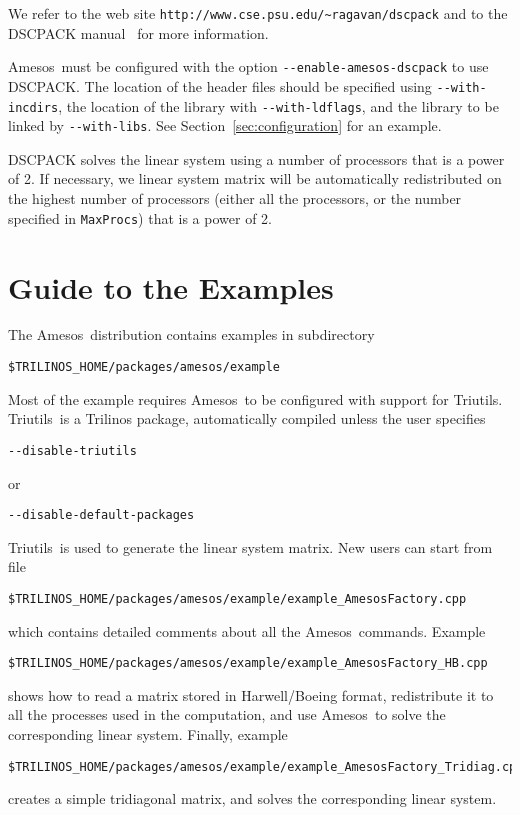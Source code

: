 \documentclass[11pt]{SANDreport}
\newcommand{\amesos}{{\sc Amesos}}
\newcommand{\triutils}{{\sc Triutils}}
\begin{document}
We refer to the web site
\verb!http://www.cse.psu.edu/~ragavan/dscpack!
and to the DSCPACK manual~\cite{dscpack-manual} for more
information.

\amesos\ must be configured with the option
\verb!--enable-amesos-dscpack! to use DSCPACK.
The location of the header files should be specified using \verb!--with-incdirs!,
the location of the library with \verb!--with-ldflags!, and the library
to be linked by \verb!--with-libs!. See Section~\ref{sec:configuration} for an
example.

DSCPACK solves the linear system using a number of processors that is a power
of 2. If necessary, we linear system matrix will be automatically
redistributed on the highest number of processors (either all the
processors, or the number specified in \verb!MaxProcs!) that is a power of 2.

\section{Guide to the Examples}
\label{sec:examples}

The \amesos\ distribution contains examples in subdirectory
\begin{verbatim}
$TRILINOS_HOME/packages/amesos/example
\end{verbatim}
Most of the example requires \amesos\ to be configured with support for
\triutils. \triutils\ is a Trilinos package, automatically compiled unless
the user specifies
\begin{verbatim}
--disable-triutils
\end{verbatim}
or
\begin{verbatim}
--disable-default-packages
\end{verbatim}
\triutils\ is used to generate the linear system matrix. New users can
start from file
\begin{verbatim}
$TRILINOS_HOME/packages/amesos/example/example_AmesosFactory.cpp
\end{verbatim}
which contains detailed comments about all the \amesos\ commands.
Example
\begin{verbatim}
$TRILINOS_HOME/packages/amesos/example/example_AmesosFactory_HB.cpp
\end{verbatim}
shows how to read a matrix stored in Harwell/Boeing format, redistribute it
to all the processes used in the computation, and use \amesos\ to solve the
corresponding linear system. Finally, example
\begin{verbatim}
$TRILINOS_HOME/packages/amesos/example/example_AmesosFactory_Tridiag.cpp
\end{verbatim}
creates a simple tridiagonal matrix, and solves the corresponding linear
system.



\end{document}
